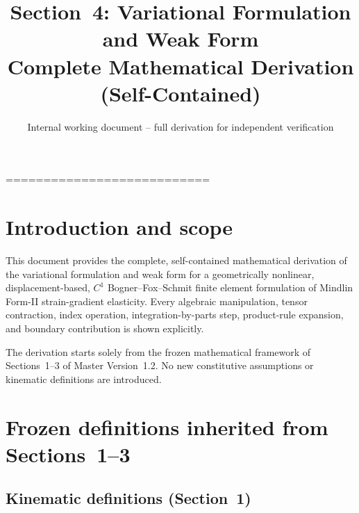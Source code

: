 \documentclass[11pt]{article}
\DeclareMathOperator{\tr}{tr}
\DeclareMathOperator{\sym}{sym}
\newcommand{\gradz}{\nabla_{0}}
\newcommand{\bX}{\mathbf{X}}
\newcommand{\bx}{\mathbf{x}}
\newcommand{\bp}{\boldsymbol{\varphi}}
\newcommand{\bu}{\mathbf{u}}
\newcommand{\bF}{\mathbf{F}}
\newcommand{\bC}{\mathbf{C}}
\newcommand{\bb}{\mathbf{b}}
\newcommand{\bE}{\mathbf{E}}
\newcommand{\bep}{\boldsymbol{\varepsilon}}
\newcommand{\bH}{\mathbf{H}}
\newcommand{\bG}{\bm{\mathcal{G}}}
\newcommand{\bR}{\mathbf{R}}
\newcommand{\bS}{\mathbf{S}}
\newcommand{\bSig}{\boldsymbol{\Sigma}}
\newcommand{\bD}{\mathbb{D}}
\newcommand{\gradz}{\nabla_{0}}
\newcommand{\bX}{\mathbf{X}}
\newcommand{\bx}{\mathbf{x}}
\newcommand{\bp}{\boldsymbol{\varphi}}
\newcommand{\bu}{\mathbf{u}}
\newcommand{\bF}{\mathbf{F}}
\newcommand{\bC}{\mathbf{C}}
\newcommand{\bb}{\mathbf{b}}
\newcommand{\bE}{\mathbf{E}}
\newcommand{\bep}{\boldsymbol{\varepsilon}}
\newcommand{\bH}{\mathbf{H}}
\newcommand{\bG}{\bm{\mathcal{G}}}
\newcommand{\bR}{\mathbf{R}}
\newcommand{\bS}{\mathbf{S}}
\newcommand{\bSig}{\boldsymbol{\Sigma}}
\newcommand{\bD}{\mathbb{D}}
\begin{document}
\usepackage[margin=1in]{geometry}
\usepackage{amsmath,amssymb,bm}
\usepackage{booktabs}
\usepackage{cite}
\usepackage{array}

\DeclareMathOperator{\tr}{tr}
\DeclareMathOperator{\sym}{sym}

\newcommand{\gradz}{\nabla_{0}}
\newcommand{\bX}{\mathbf{X}}
\newcommand{\bx}{\mathbf{x}}
\newcommand{\bp}{\boldsymbol{\varphi}}
\newcommand{\bu}{\mathbf{u}}
\newcommand{\bF}{\mathbf{F}}
\newcommand{\bC}{\mathbf{C}}
\newcommand{\bb}{\mathbf{b}}
\newcommand{\bE}{\mathbf{E}}
\newcommand{\bep}{\boldsymbol{\varepsilon}}
\newcommand{\bH}{\mathbf{H}}
\newcommand{\bG}{\bm{\mathcal{G}}}
\newcommand{\bR}{\mathbf{R}}
\newcommand{\bS}{\mathbf{S}}
\newcommand{\bSig}{\boldsymbol{\Sigma}}
\newcommand{\bD}{\mathbb{D}}

\title{Section~4: Variational Formulation and Weak Form \\
\large Complete Mathematical Derivation (Self-Contained)}
\author{Internal working document -- full derivation for independent verification}
\date{}

===========================
\section{Introduction and scope}

This document provides the complete, self-contained mathematical
derivation of the variational formulation and weak form for a
geometrically nonlinear, displacement-based, $C^{1}$ Bogner--Fox--Schmit
finite element formulation of Mindlin Form-II strain-gradient
elasticity. Every algebraic manipulation, tensor contraction, index
operation, integration-by-parts step, product-rule expansion, and
boundary contribution is shown explicitly.

The derivation starts solely from the frozen mathematical framework
of Sections~1--3 of Master Version~1.2. No new constitutive assumptions
or kinematic definitions are introduced.

\section{Frozen definitions inherited from Sections~1--3}

\subsection{Kinematic definitions (Section~1)}
\end{document}
